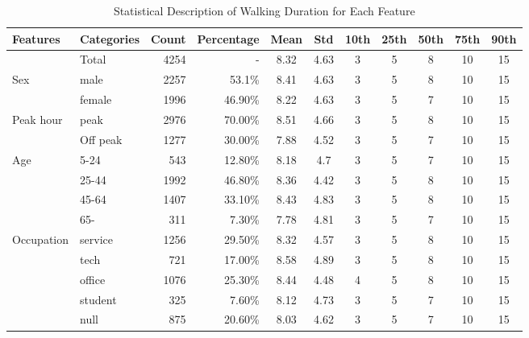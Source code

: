 \begin{sidewaystable}[htbp]
	\small
	\caption{Statistical Description of Walking Duration for Each Feature}
	\label{tab:chp4:StatisticalDescription}
	\centering
	\renewcommand{\arraystretch}{1.3}
	\begin{tabular}{llrrccccccc}
		\Xhline{1.5pt}
		Features & Categories & Count & Percentage & Mean & Std & 10th & 25th & 50th & 75th & 90th\\
		
		\midrule
		& Total    & 4254  & -         & 8.32  & 4.63  & 3     & 5     & 8     & 10    & 15 \\
		
		\midrule
		\multicolumn{1}{l}{Sex}
		& male     & 2257  & 53.1\%    & 8.41  & 4.63  & 3     & 5     & 8     & 10    & 15 \\
		& female   & 1996  & 46.90\%   & 8.22  & 4.63  & 3     & 5     & 7     & 10    & 15 \\
		
		\midrule
		\multicolumn{1}{l}{Peak hour}
		& peak     & 2976  & 70.00\%   & 8.51  & 4.66  & 3     & 5     & 8     & 10    & 15 \\
		& Off peak & 1277  & 30.00\%   & 7.88  & 4.52  & 3     & 5     & 7     & 10    & 15 \\
		
		\midrule
		\multicolumn{1}{l}{Age}
		& 5-24     & 543   & 12.80\%   & 8.18  & 4.7   & 3     & 5     & 7     & 10    & 15 \\
		& 25-44    & 1992  & 46.80\%   & 8.36  & 4.42  & 3     & 5     & 8     & 10    & 15 \\
		& 45-64    & 1407  & 33.10\%   & 8.43  & 4.83  & 3     & 5     & 8     & 10    & 15 \\
		& 65-      & 311   &  7.30\%   & 7.78  & 4.81  & 3     & 5     & 7     & 10    & 15 \\
		
		\midrule
		\multicolumn{1}{l}{Occupation}
		& service  & 1256  & 29.50\%   & 8.32  & 4.57  & 3     & 5     & 8     & 10    & 15 \\
		& tech     & 721   & 17.00\%   & 8.58  & 4.89  & 3     & 5     & 8     & 10    & 15 \\
		& office   & 1076  & 25.30\%   & 8.44  & 4.48  & 4     & 5     & 8     & 10    & 15 \\
		& student  & 325   &  7.60\%   & 8.12  & 4.73  & 3     & 5     & 7     & 10    & 15 \\
		& null     & 875   & 20.60\%   & 8.03  & 4.62  & 3     & 5     & 7     & 10    & 15 \\
		

\end{tabular}
\end{sidewaystable}
